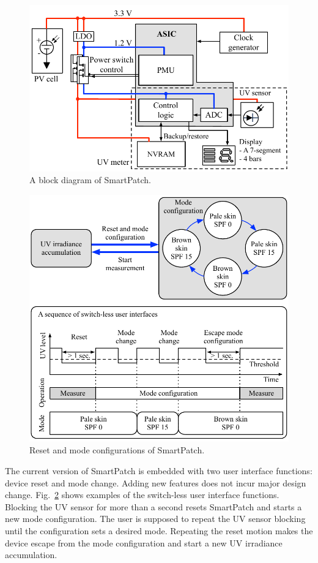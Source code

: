 \documentclass[journal]{IEEEtran}
\begin{document}
\begin{figure}
\centering
\includegraphics[width=1.0\hsize]{Figures/block_diagram.pdf}
\caption{A block diagram of SmartPatch.}
\label{fig:block_diagram}
\end{figure}      

\begin{figure}
\centering
\includegraphics[width=1.0\hsize]{Figures/configuration.pdf}
\caption{Reset and mode configurations of SmartPatch.}
\label{fig:configuration}
\end{figure}      

The current version of SmartPatch is embedded with two user interface functions: device reset and mode change.
Adding new features does not incur major design change. 
Fig.~\ref{fig:configuration} shows examples of the switch-less user interface functions. 
Blocking the UV sensor for more than a second resets SmartPatch and starts a new mode configuration.
The user is supposed to repeat the UV sensor blocking until the configuration sets a desired mode.
Repeating the reset motion makes the device escape from the mode configuration and start a new UV irradiance accumulation.
\end{document}
